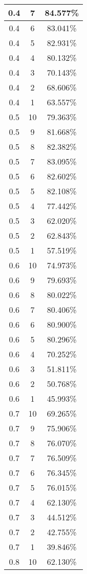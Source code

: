 \begin{center}
\begin{longtable}{|c|c|c|}
\hline
0.4 & 7 & 84.577\% \\
\hline
0.4 & 6 & 83.041\% \\
\hline
0.4 & 5 & 82.931\% \\
\hline
0.4 & 4 & 80.132\% \\
\hline
0.4 & 3 & 70.143\% \\
\hline
0.4 & 2 & 68.606\% \\
\hline
0.4 & 1 & 63.557\% \\
\hline
\hline
0.5 & 10 & 79.363\% \\
\hline
0.5 & 9 & 81.668\% \\
\hline
0.5 & 8 & 82.382\% \\
\hline
0.5 & 7 & 83.095\% \\
\hline
0.5 & 6 & 82.602\% \\
\hline
0.5 & 5 & 82.108\% \\
\hline
0.5 & 4 & 77.442\% \\
\hline
0.5 & 3 & 62.020\% \\
\hline
0.5 & 2 & 62.843\% \\
\hline
0.5 & 1 & 57.519\% \\
\hline
\hline
0.6 & 10 & 74.973\% \\
\hline
0.6 & 9 & 79.693\% \\
\hline
0.6 & 8 & 80.022\% \\
\hline
0.6 & 7 & 80.406\% \\
\hline
0.6 & 6 & 80.900\% \\
\hline
0.6 & 5 & 80.296\% \\
\hline
0.6 & 4 & 70.252\% \\
\hline
0.6 & 3 & 51.811\% \\
\hline
0.6 & 2 & 50.768\% \\
\hline
0.6 & 1 & 45.993\% \\
\hline
\hline
0.7 & 10 & 69.265\% \\
\hline
0.7 & 9 & 75.906\% \\
\hline
0.7 & 8 & 76.070\% \\
\hline
0.7 & 7 & 76.509\% \\
\hline
0.7 & 6 & 76.345\% \\
\hline
0.7 & 5 & 76.015\% \\
\hline
0.7 & 4 & 62.130\% \\
\hline
0.7 & 3 & 44.512\% \\
\hline
0.7 & 2 & 42.755\% \\
\hline
0.7 & 1 & 39.846\% \\
\hline
\hline
0.8 & 10 & 62.130\% \\

\end{longtable}
\end{center}

